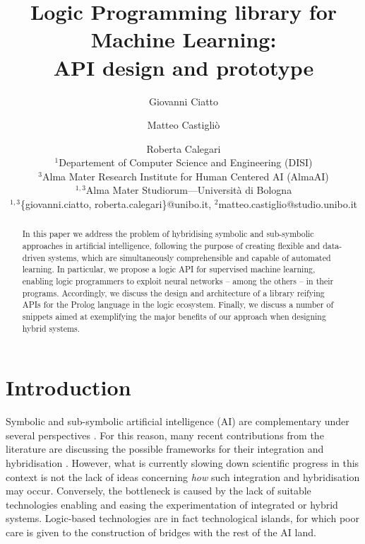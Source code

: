 \documentclass{article}
\title{
    Logic Programming library for Machine Learning:
    \\
    API design and prototype
}
\author{%
    Giovanni Ciatto
    \and
    Matteo Castigliò
    \and
    Roberta Calegari
    \\
    \affiliations
    $^1$Departement of Computer Science and Engineering (DISI) %
    \\
    $^3$Alma Mater Research Institute for Human Centered AI (AlmaAI)
    \\
    $^{1,3}$Alma Mater Studiorum---Università di Bologna
    \\
    \emails\ttfamily
    $^{1,3}$\{giovanni.ciatto, roberta.calegari\}@unibo.it,
    $^{2}$matteo.castiglio@studio.unibo.it
}
\begin{document}
\maketitle

\begin{abstract}

In this paper we address the problem of hybridising symbolic and sub-symbolic approaches in artificial intelligence, following the purpose of creating flexible and data-driven systems, which are simultaneously comprehensible and capable of automated learning.
%
In particular, we propose a logic API for supervised machine learning, enabling logic programmers to exploit neural networks -- among the others -- in their programs.
%
Accordingly, we discuss the design and architecture of a library reifying APIs for the Prolog language in the \twopkt{} logic ecosystem.
%
Finally, we discuss a number of snippets aimed at exemplifying the major benefits of our approach when designing hybrid systems.

\end{abstract}

\section{Introduction}
\label{sec:introduction}

Symbolic and sub-symbolic artificial intelligence (AI) are complementary under several perspectives \cite{ilkou2020symbolic,xaisurvey-ia14}.
%
%
For this reason, many recent contributions from the literature are discussing the possible frameworks for their integration and hybridisation \cite{BarredoArrieta2020,Goertzel2012,lpaas-bdcc2,xailp-woa2019}.
%
However, what is currently slowing down scientific progress in this context is not the lack of ideas concerning \emph{how} such integration and hybridisation may occur.
%
Conversely, the bottleneck is caused by the lack of suitable technologies enabling and easing the experimentation of integrated or hybrid systems.
%
Logic-based technologies are in fact technological islands, for which poor care is given to the construction of bridges with the rest of the AI land.
\end{document}
